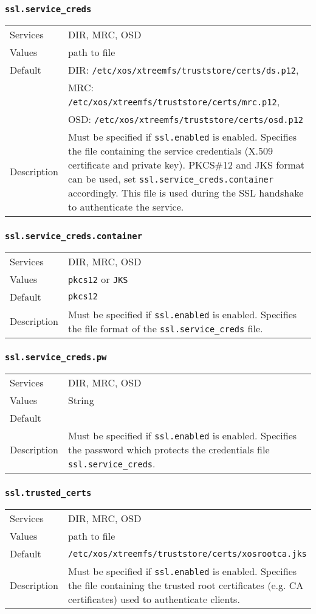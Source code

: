 \documentclass[a4paper,10pt]{book}
\begin{document}
\subsubsection{\texttt{ssl.service\_creds}}
\begin{tabular}{lp{10cm}}
 Services & DIR, MRC, OSD\\
 Values   & path to file\\
 Default  & DIR: \texttt{/etc/xos/xtreemfs/truststore/certs/ds.p12}, \\
 & MRC: \texttt{/etc/xos/xtreemfs/truststore/certs/mrc.p12}, \\
 & OSD: \texttt{/etc/xos/xtreemfs/truststore/certs/osd.p12}\\
 Description & Must be specified if \texttt{ssl.enabled} is enabled. Specifies the file containing the service credentials (X.509 certificate and private key). PKCS\#12 and JKS format can be used, set \texttt{ssl.service\_creds.container} accordingly. This file is used during the SSL handshake to authenticate the service.
\end{tabular}

\subsubsection{\texttt{ssl.service\_creds.container}}
\begin{tabular}{lp{10cm}}
 Services & DIR, MRC, OSD\\
 Values   & \texttt{pkcs12} or \texttt{JKS}\\
 Default  & \texttt{pkcs12}\\
 Description & Must be specified if \texttt{ssl.enabled} is enabled. Specifies the file format of the \texttt{ssl.service\_creds} file.
\end{tabular}

\subsubsection{\texttt{ssl.service\_creds.pw}}
\begin{tabular}{lp{10cm}}
 Services & DIR, MRC, OSD\\
 Values   & String\\
 Default  & \\
 Description & Must be specified if \texttt{ssl.enabled} is enabled. Specifies the password which protects the credentials file \texttt{ssl.service\_creds}.
\end{tabular}

\subsubsection{\texttt{ssl.trusted\_certs}}
\begin{tabular}{lp{10cm}}
 Services & DIR, MRC, OSD\\
 Values   & path to file\\
 Default  & \texttt{/etc/xos/xtreemfs/truststore/certs/xosrootca.jks}\\
 Description & Must be specified if \texttt{ssl.enabled} is enabled. Specifies the file containing the trusted root certificates (e.g. CA certificates) used to authenticate clients.
\end{tabular}
\end{document}

